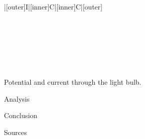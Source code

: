 \begin{paper}
{\begin{papertable}{|[outer]I|[inner]C|[inner]C|[outer]}
			\papertableindex{}\\\paperiline
			\papertableindex{}\\\paperiline
			\papertableindex{}\\\paperiline
			\papertableindex{}\\\paperiline
			\papertableindex{}\\\paperiline
			\papertableindex{}\\\paperiline
			\papertableindex{}\\\paperoline
			\end{papertable}\vspace{-1.5em}}
	{Potential and current through the light bulb.}\vspace{1em}


	Analysis


	Conclusion


	Sources

\papersource{}

\end{paper}

